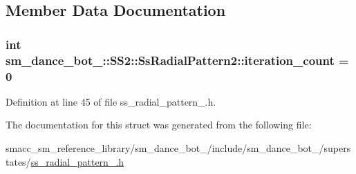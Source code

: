 \subsection{Member Data Documentation}
\subsubsection[{\texorpdfstring{iteration\+\_\+count}{iteration_count}}]{\setlength{\rightskip}{0pt plus 5cm}int sm\+\_\+dance\+\_\+bot\+\_\+::\+S\+S2\+::\+Ss\+Radial\+Pattern2\+::iteration\+\_\+count = 0}\hypertarget{structsm__dance__bot__3_1_1SS2_1_1SsRadialPattern2_ae214d5caeae81f505b2b41e4d6427cd3}{}\label{structsm__dance__bot__3_1_1SS2_1_1SsRadialPattern2_ae214d5caeae81f505b2b41e4d6427cd3}


Definition at line 45 of file ss\+\_\+radial\+\_\+pattern\+\_.\+h.



The documentation for this struct was generated from the following file\+:\begin{DoxyCompactItemize}
\item 
smacc\+\_\+sm\+\_\+reference\+\_\+library/sm\+\_\+dance\+\_\+bot\+\_/include/sm\+\_\+dance\+\_\+bot\+\_/superstates/\hyperlink{3_2include_2sm__dance__bot__3_2superstates_2ss__radial__pattern__2_8h}{ss\+\_\+radial\+\_\+pattern\+\_.\+h}\end{DoxyCompactItemize}
